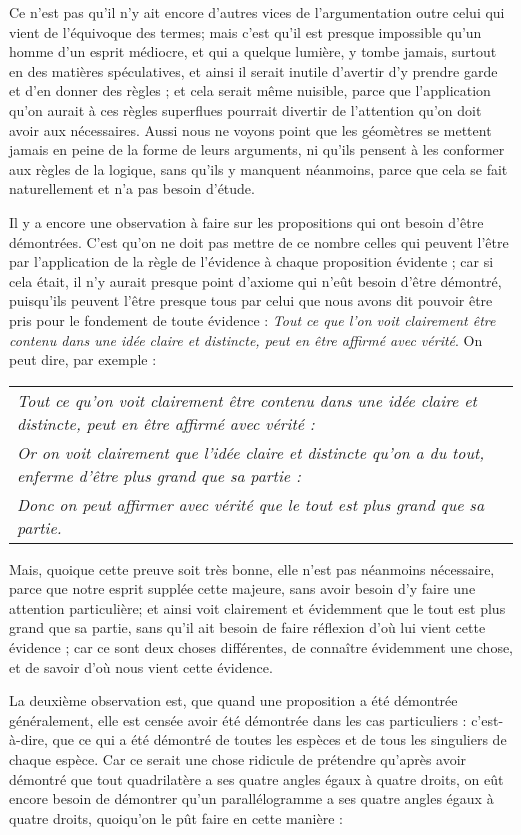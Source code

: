 Ce n'est pas qu'il n'y ait encore d'autres vices de l'argumentation outre celui qui vient de l'équivoque des termes; mais c'est qu'il est presque impossible qu'un homme d'un esprit médiocre, et qui a quelque lumière, y tombe jamais, surtout en des matières spéculatives, et ainsi il serait inutile d'avertir d'y prendre garde et d'en donner des règles ; et cela serait même nuisible, parce que l'application qu'on aurait à ces règles superflues pourrait divertir de l'attention qu'on doit avoir aux nécessaires. Aussi nous ne voyons point que les géomètres se mettent jamais en peine de la forme de leurs arguments, ni qu'ils pensent à les conformer aux règles de la logique, sans qu'ils y manquent néanmoins, parce que cela se fait naturellement et n'a pas besoin d'étude.

Il y a encore une observation à faire sur les propositions qui ont besoin d'être démontrées. C'est qu'on ne doit pas mettre de ce nombre celles qui peuvent l'être par l'application de la règle de l'évidence à chaque proposition évidente ; car si cela était, il n'y aurait presque point d'axiome qui n'eût besoin d'être démontré, puisqu'ils peuvent l'être presque tous par celui que nous avons dit pouvoir être pris pour le fondement de toute évidence : \emph{Tout ce que l'on voit clairement être contenu dans une idée claire et distincte, peut en être affirmé avec vérité}. On peut dire, par exemple :

	\begin{tabularx}{\textwidth}{X}
		\emph{Tout ce qu'on voit clairement être contenu dans une idée claire et distincte, peut en être affirmé avec vérité :} \\
		\emph{Or on voit clairement que l'idée claire et distincte qu'on a du tout, enferme d'être plus grand que sa partie :} \\
		\emph{Donc on peut affirmer avec vérité que le tout est plus grand que sa partie.} \\
	\end{tabularx}

Mais, quoique cette preuve soit très bonne, elle n'est pas néanmoins nécessaire, parce que notre esprit supplée cette majeure, sans avoir besoin d'y faire une attention particulière; et ainsi voit clairement et évidemment que le tout est plus grand que sa partie, sans qu'il ait besoin de faire réflexion d'où lui vient cette évidence ; car ce sont deux choses différentes, de connaître évidemment une chose, et de savoir d'où nous vient cette évidence.

La deuxième observation est, que quand une proposition a été démontrée généralement, elle est censée avoir été démontrée dans les cas particuliers : c'est-à-dire, que ce qui a été démontré de toutes les espèces et de tous les singuliers de chaque espèce. Car ce serait une chose ridicule de prétendre qu'après avoir démontré que tout quadrilatère a ses quatre angles égaux à quatre droits, on eût encore besoin de démontrer qu'un parallélogramme a ses quatre angles égaux à quatre droits, quoiqu'on le pût faire en cette manière :


